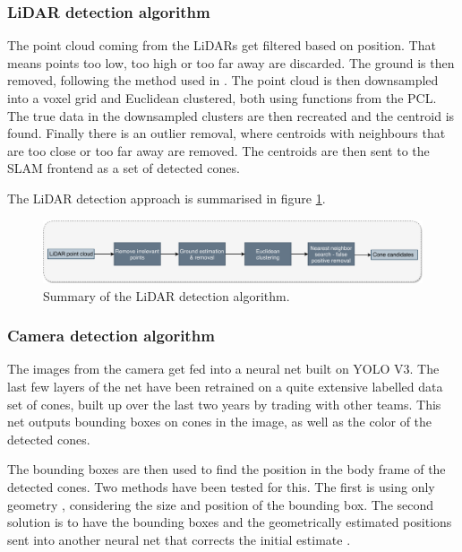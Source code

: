 \subsubsection{LiDAR detection algorithm}
The point cloud coming from the \glspl{LiDAR} get filtered based on position. That means points too low, too high or too far away are discarded. The ground is then removed, following the method used in \cite{GroundRemoval}. The point cloud is then downsampled into a voxel grid and Euclidean clustered, both using functions from the \gls{PCL}\cite{PCL}. The true data in the downsampled clusters are then recreated and the centroid is found. Finally there is an outlier removal, where centroids with neighbours that are too close or too far away are removed. The centroids are then sent to the \gls{SLAM} frontend as a set of detected cones.

The \gls{LiDAR} detection approach is summarised in figure \ref{Fig:LiDARApproach}.

\begin{figure}
    \centering
    \includegraphics[width=\linewidth]{0_Images/3_Background/LiDARApproach.pdf}
    \caption[Summary of the LiDAR detection algorithm.]{Summary of the LiDAR detection algorithm.}
    \label{Fig:LiDARApproach}
\end{figure}

\subsubsection{Camera detection algorithm}

The images from the camera get fed into a neural net built on \gls{YOLO} V3\cite{YOLOV3}. The last few layers of the net have been retrained on a quite extensive labelled data set of cones, built up over the last two years by trading with other teams. This net outputs bounding boxes on cones in the image, as well as the color of the detected cones. 

The bounding boxes are then used to find the position in the body frame of the detected cones. Two methods have been tested for this. The first is using only geometry \cite{BBGeometry}, considering the size and position of the bounding box. The second solution is to have the bounding boxes and the geometrically estimated positions sent into another neural net that corrects the initial estimate \cite{PosNeuralNetCorrection}. 
